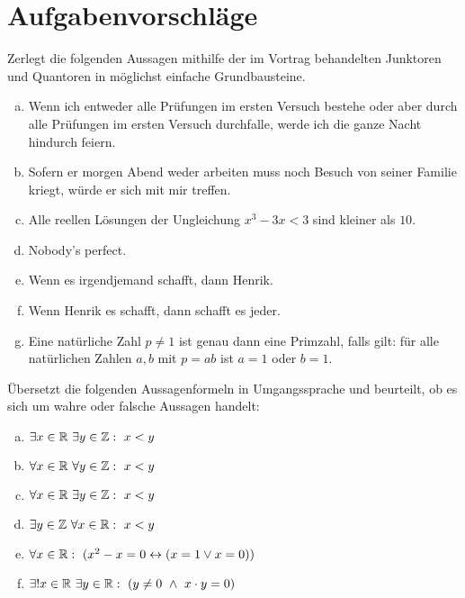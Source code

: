 \newpage
\section{Aufgabenvorschläge}




\begin{aufg}
Zerlegt die folgenden Aussagen mithilfe der im Vortrag behandelten Junktoren und Quantoren in möglichst einfache Grundbausteine.
\begin{enumerate}[a)]
\item Wenn ich entweder alle Prüfungen im ersten Versuch bestehe oder aber durch alle Prüfungen im ersten Versuch durchfalle, werde ich die ganze Nacht hindurch feiern.
 \item Sofern er morgen Abend weder arbeiten muss noch Besuch von seiner Familie kriegt, würde er sich mit mir treffen.
  \item Alle reellen Lösungen der Ungleichung $x^3-3x<3$ sind kleiner als $10$.
 \item Nobody’s perfect.
 \item Wenn es irgendjemand schafft, dann Henrik.
 \item Wenn Henrik es schafft, dann schafft es jeder.
 \item Eine natürliche Zahl $p\neq 1$ ist genau dann eine Primzahl, falls gilt: für alle natürlichen Zahlen $a,b$ mit $p=ab$ ist $a=1$ oder $b=1$.
\end{enumerate}
\end{aufg}





\begin{aufg}
Übersetzt die folgenden Aussagenformeln in Umgangssprache und beurteilt, ob es sich um wahre oder falsche Aussagen handelt:
	\begin{enumerate}[a)]
	\item $\exists x\in \Rz\ \exists y\in \Zz:\ x<y$
	\item $\forall x\in \Rz\ \forall y\in \Zz:\ x<y$
		\item $\forall x\in \Rz\ \exists y\in \Zz:\ x<y$
		\item $\exists y\in \Zz\ \forall x\in \Rz:\ x<y$
		\item $\forall x\in {\mathbb R}:\ (x^2 -x=0\leftrightarrow(x=1\vee x=0))$
		\item $\exists! x\in \Rz\ \exists y\in \Rz:\ (y\neq0\ \land\ x\cdot y=0)$
	\end{enumerate}
\end{aufg}



